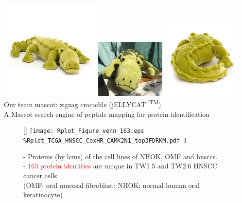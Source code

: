\documentclass[
paper=landscape,
paper=160mm:90mm, %
fontsize=11pt, %
pagesize, %
parskip=half-, %
]{scrartcl} %
\theoremstyle{mythmstyle} %
\begin{document}
{\includegraphics[width=5cm]{ZIG2C.jpg}
\includegraphics[width=3.5cm]{IMG_8273.jpg}
\includegraphics[width=4cm]{ZIG2C_2.jpg}
\\

{\tiny \hspace{4.5cm} Our team mascot: zigzag crocodile (jELLYCAT~\textsuperscript{TM})}\\
A Mascot search engine of peptide mapping for protein identification\\


\clearpage


\thispagestyle{headings}

\begin{figure}[ht]

[\FBwidth]
{    \texttt{[image: 
Rplot\_Figure\_venn\_163.eps
\%Rplot\_TCGA\_HNSCC\_CoxHR\_CAMK2N1\_top3FDRKM.pdf
]}
}
{\captionsetup{labelformat=empty}    %
\caption{
- Proteins {\scriptsize (by \acrshort{lcms})} of the cell lines of NHOK, OMF and \acrshort{hnscc}s. \\[0.2cm]
- \textcolor{red}{163 protein identities} are unique in TW1.5 and TW2.6 HNSCC cancer cells \\[0.2CM]
\tiny (OMF: oral mucosal fibroblast; NHOK: normal human oral keratinocyte)%
    }}
\end{figure}


}
\end{document}
